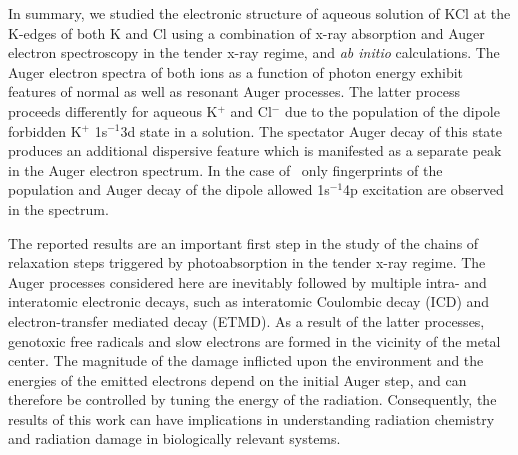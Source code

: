 
In summary, we studied the electronic structure of aqueous solution of KCl at the K-edges of both K and Cl using a combination of x-ray absorption and Auger electron spectroscopy in the tender x-ray regime, and {\it ab initio} calculations. The Auger electron spectra of both ions as a function of photon energy exhibit features of normal as well as resonant Auger processes. The latter process proceeds differently for aqueous K$^{+}$ and Cl$^{-}$ due to the population of the dipole forbidden K$^{+}$ 1s$^{-1}$3d state in a solution. The spectator Auger decay of this state produces an additional dispersive feature which is manifested as a separate peak in the Auger electron spectrum. In the case of \cli~only fingerprints of the population and Auger decay of the dipole allowed 1s$^{-1}$4p excitation are observed in the spectrum.


The reported results are an important first step in the study of the chains of relaxation steps triggered by photoabsorption in the tender x-ray regime. The Auger processes considered here are inevitably followed by multiple intra- and interatomic electronic decays, such as interatomic Coulombic decay (ICD) and electron-transfer mediated decay (ETMD). As a result of the latter processes, genotoxic free radicals and slow electrons are formed in the vicinity of the metal center. The magnitude of the damage inflicted upon the environment and the energies of the emitted electrons depend on the initial Auger step, and can therefore be controlled by tuning the energy of the radiation. Consequently, the results of this work can have implications in understanding radiation chemistry and radiation damage in biologically relevant systems.